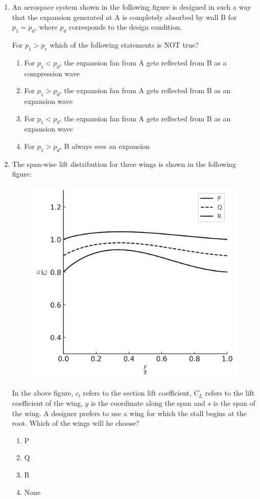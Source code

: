 \documentclass{article}
\begin{document}
\begin{enumerate}
    \item An aerospace system shown in the following figure is designed in such a way that the expansion generated at A is completely absorbed by wall B for $p_1 = p_d$, where $p_d$ corresponds to the design condition.

    \begin{figure}[H]
        \centering
        
        \caption{}
        \label{}
    \end{figure}
    
    For $p_1 > p_e$ which of the following statements is NOT true?
    \begin{enumerate}
        \item For $p_1 < p_d$, the expansion fan from A gets reflected from B as a compression wave
        \item For $p_1 > p_d$, the expansion fan from A gets reflected from B as an expansion wave
        \item For $p_1 < p_d$, the expansion fan from A gets reflected from B as an expansion wave
        \item For $p_1 > p_d$, B always sees an expansion
    \end{enumerate}

    \item The span-wise lift distribution for three wings is shown in the following figure:
    \begin{figure}
        \centering
        \includegraphics[width=0.5\linewidth]{figs/q68.png}
        \caption{}
        \label{}
    \end{figure}
    
    In the above figure, $c_l$ refers to the section lift coefficient, $C_L$ refers to the lift coefficient of the wing, $y$ is the coordinate along the span and $s$ is the span of the wing. A designer prefers to use a wing for which the stall begins at the root. Which of the wings will he choose?
    \begin{multicols}{4}
    \begin{enumerate}
        \item P
        \item Q
        \item R
        \item None
    \end{enumerate}
    \end{multicols}
    


\end{enumerate}
\end{document}
